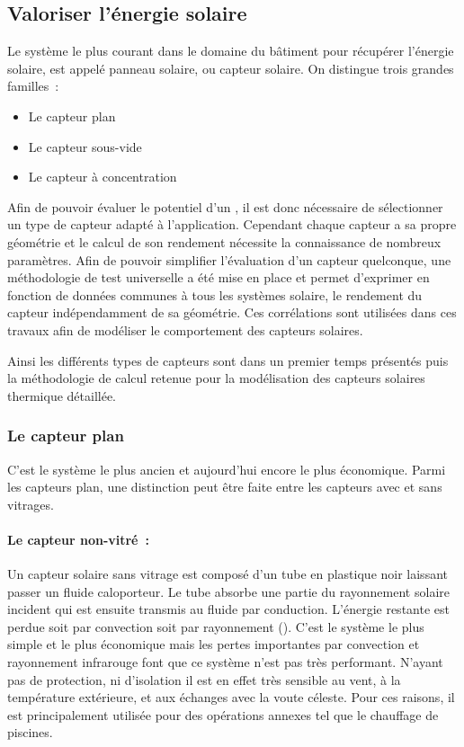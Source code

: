 \subsection{Valoriser l’énergie solaire} %
\label{sub:valoriser_l_energie_solaire}
Le système le plus courant dans le domaine du bâtiment pour récupérer l’énergie solaire,
est appelé panneau solaire, ou capteur solaire. On distingue trois grandes familles~:
\begin{itemize}
    \item Le capteur plan
    \item Le capteur sous-vide
    \item Le capteur à concentration
\end{itemize}

Afin de pouvoir évaluer le potentiel d’un , il est donc nécessaire de
sélectionner un type de capteur adapté à l’application. Cependant chaque capteur a sa
propre géométrie et le calcul de son rendement nécessite la connaissance de nombreux
paramètres. Afin de pouvoir simplifier l’évaluation d’un capteur quelconque, une
méthodologie de test universelle a été mise en place et permet d’exprimer en fonction de
données communes à tous les systèmes solaire, le rendement du capteur indépendamment de
sa géométrie. Ces corrélations sont utilisées dans ces travaux afin de
modéliser le comportement des capteurs solaires.

Ainsi les différents types de capteurs sont dans un premier temps présentés puis
la méthodologie de calcul retenue pour la modélisation des capteurs solaires
thermique détaillée.



\subsubsection{Le capteur plan} %
\label{ssub:le_capteur_plan}
C’est le système le plus ancien et aujourd’hui encore le plus économique. Parmi les
capteurs plan, une distinction peut être faite entre les capteurs avec et sans vitrages.

\paragraph{Le capteur non-vitré~:} %
\label{par:le_capteur_non_vitre}
Un capteur solaire sans vitrage est composé d’un tube en plastique noir laissant passer un
fluide caloporteur. Le tube absorbe une partie du rayonnement solaire incident qui est
ensuite transmis au fluide par conduction. L’énergie restante est perdue soit par
convection soit par rayonnement (). C’est le système le plus
simple et le plus économique mais les pertes importantes par convection et rayonnement
infrarouge font que ce système n’est pas très performant. N’ayant pas de protection, ni
d’isolation il est en effet très sensible au vent, à la température extérieure, et aux
échanges avec la voute céleste. Pour ces raisons, il est principalement utilisée pour des
opérations annexes tel que le chauffage de piscines.

